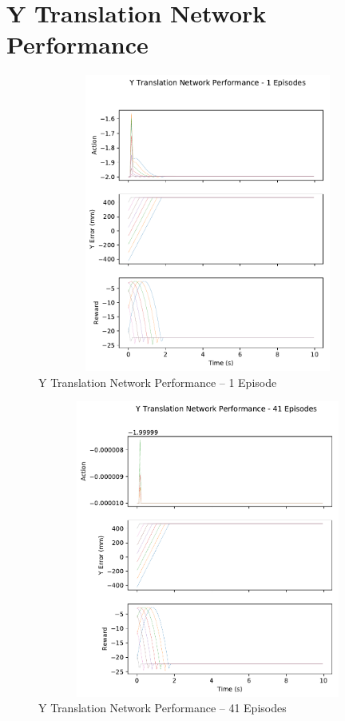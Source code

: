 \chapter{Y Translation Network Performance}
\label{appendix:y_perf}
\begin{figure}[H]
	\centering
	\includegraphics[width=6in, height=3.85in, keepaspectratio]{figures/train_figs/transy_transitions/2_1.pdf}
	\caption{Y Translation Network Performance -- 1 Episode}
\end{figure}
\begin{figure}[H]
	\centering
	\includegraphics[width=6in, height=3.85in, keepaspectratio]{figures/train_figs/transy_transitions/2_41.pdf}
	\caption{Y Translation Network Performance -- 41 Episodes}
\end{figure}
